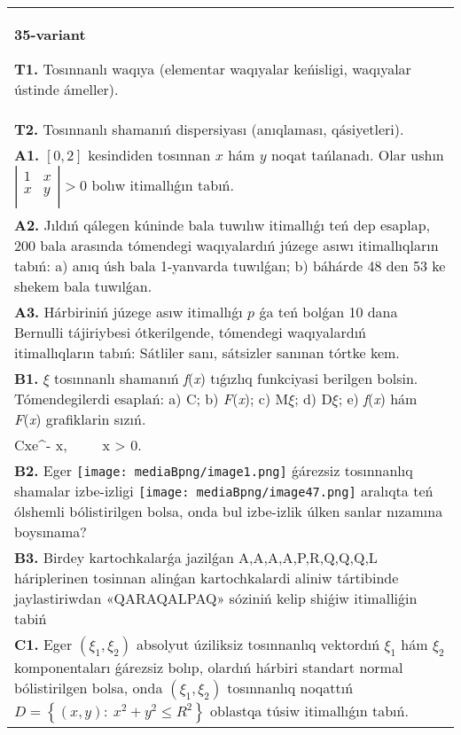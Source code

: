 \documentclass{article}
\begin{document}
\begin{tabular}{m{17cm}}
\textbf{35-variant}
\newline

\textbf{T1.} Tosınnanlı waqıya (elementar waqıyalar keńisligi, waqıyalar ústinde ámeller).
 \\
\textbf{T2.} Tosınnanlı shamanıń dispersiyası (anıqlaması, qásiyetleri).
 \\
\textbf{A1.} $\left[ 0,2 \right]$ kesindiden tosınnan $x$ hám $y$ noqat tańlanadı. Olar ushın $\left| \begin{matrix}
   1 & x  \\
   x & y  \\
\end{matrix} \right|>0$ bolıw itimallıǵın tabıń.
 \\
\textbf{A2.} Jıldıń qálegen kúninde bala tuwılıw itimallıǵı teń dep esaplap, 200 bala arasında tómendegi waqıyalardıń júzege asıwı itimallıqların tabıń: a) anıq úsh bala 1-yanvarda tuwılǵan; b) báhárde 48 den 53 ke shekem bala tuwılǵan.
 \\
\textbf{A3.} Hárbiriniń júzege asıw itimallıǵı $p$ ǵa teń bolǵan 10 dana Bernulli tájiriybesi ótkerilgende, tómendegi waqıyalardıń itimallıqların tabıń: Sátliler sanı, sátsizler sanınan tórtke kem.
 \\
\textbf{B1.} $\xi$ tosınnanlı shamanıń \emph{f}(\emph{x}) tıǵızlıq funkciyasi berilgen bolsin. Tómendegilerdi esaplań: a) C; b) \emph{F}(\emph{x}); c) M$\xi$; d) D$\xi$; e) \emph{f}(\emph{x}) hám \emph{F}(\emph{x}) grafiklarin sızıń.\(f(x) = \left\{ \begin{matrix}
\ \ \ \ \ \ \ \ 0,\ \ \ \ \ \ x \leq 0, \\
Cxe^{- x},\ \ \ \ \ x > 0.\ \ 
\end{matrix} \right.\ \)
 \\
\textbf{B2.} Eger \texttt{[image: mediaBpng/image1.png]} ǵárezsiz tosınnanlıq shamalar izbe-izligi \texttt{[image: mediaBpng/image47.png]} aralıqta teń ólshemli bólistirilgen bolsa, onda bul izbe-izlik úlken sanlar nızamına boysınama?
 \\
\textbf{B3.} Birdey kartochkalarǵa jazilǵan A,A,A,A,P,R,Q,Q,Q,L háriplerinen tosinnan alinǵan kartochkalardi aliniw tártibinde jaylastiriwdan «QARAQALPAQ» sóziniń kelip shiǵiw itimalliǵin tabiń
 \\
\textbf{C1.} Eger \(\left( \xi_{1},\xi_{2} \right)\) absolyut úziliksiz tosınnanlıq vektordıń \(\xi_{1}\) hám \(\xi_{2}\) komponentaları ǵárezsiz bolıp, olardıń hárbiri standart normal bólistirilgen bolsa, onda \(\left( \xi_{1},\xi_{2} \right)\) tosınnanlıq noqattıń \(D = \left\{ (x,y):\ x^{2} + y^{2} \leq R^{2} \right\}\) oblastqa túsiw itimallıǵın tabıń.

\end{tabular}
\end{document}
